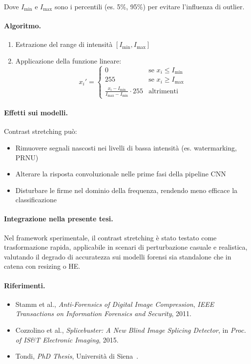Dove $I_{\min}$ e $I_{\max}$ sono i percentili (es. 5\%, 95\%) per evitare l’influenza di outlier.

\paragraph{Algoritmo.}
\begin{enumerate}
    \item Estrazione del range di intensità $[I_{\min}, I_{\max}]$
    \item Applicazione della funzione lineare:
    \[
    x_i' = \begin{cases}
    0 & \text{se } x_i \leq I_{\min} \\
    255 & \text{se } x_i \geq I_{\max} \\
    \frac{x_i - I_{\min}}{I_{\max} - I_{\min}} \cdot 255 & \text{altrimenti}
    \end{cases}
    \]
\end{enumerate}



\paragraph{Effetti sui modelli.}
Contrast stretching può:
\begin{itemize}
\item Rimuovere segnali nascosti nei livelli di bassa intensità (es. watermarking, PRNU)
\item Alterare la risposta convoluzionale nelle prime fasi della pipeline CNN
\item Disturbare le firme nel dominio della frequenza, rendendo meno efficace la classificazione
\end{itemize}

\paragraph{Integrazione nella presente tesi.}
Nel framework sperimentale, il contrast stretching è stato testato come trasformazione rapida, applicabile in scenari di perturbazione casuale e realistica, valutando il degrado di accuratezza sui modelli forensi sia standalone che in catena con resizing o HE.

\paragraph{Riferimenti.}
\begin{itemize}
    \item Stamm et al., \textit{Anti-Forensics of Digital Image Compression}, \textit{IEEE Transactions on Information Forensics and Security}, 2011.
    \item Cozzolino et al., \textit{Splicebuster: A New Blind Image Splicing Detector}, in \textit{Proc. of IS\&T Electronic Imaging}, 2015.
    \item Tondi, \textit{PhD Thesis}, Università di Siena~\cite{phd_unisi_068552}.
\end{itemize}





